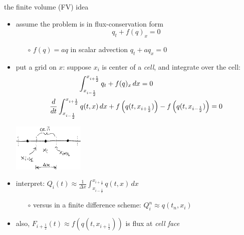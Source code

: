 \documentclass[10pt,hyperref,dvipsnames]{beamer}
\newcommand{\xiphalf}{{x_{i+\frac{1}{2}}}}
\newcommand{\ximhalf}{{x_{i-\frac{1}{2}}}}
\newcommand{\Fiphalf}{{F_{i+\frac{1}{2}}}}
\newcommand{\ds}{\displaystyle}
\begin{document}
\begin{frame}{the finite volume (FV) idea}

\begin{itemize}
\item assume the problem is in flux-conservation form
    $$q_t + f(q)_x = 0$$

    \begin{itemize}
    \item[$\circ$] $f(q) = aq$ in scalar advection $q_t + a q_x = 0$
    \end{itemize}
\item put a grid on $x$: suppose $x_i$ is center of a \emph{cell}, and integrate over the cell:
\begin{gather*}
\int_\ximhalf^\xiphalf q_t + f(q)_x \,dx = 0 \hspace{20mm}  \\
\frac{d}{dt} \int_\ximhalf^\xiphalf q(t,x) \,dx + f\left(q(t,\xiphalf)\right) - f\left(q(t,\ximhalf)\right) = 0
\end{gather*}

\vspace{-4mm}
\hfill \includegraphics[width=0.27\textwidth]{figs/fvsketch}

\vspace{-20mm}
\item interpret: $\ds Q_i(t) \approx \frac{1}{\Delta x} \int_\ximhalf^\xiphalf q(t,x)\,dx$
    \begin{itemize}
    \item[$\circ$] versus in a finite difference scheme: $Q_i^n \approx q(t_n,x_i)$
    \end{itemize}
\item also, $\Fiphalf(t) \approx f\left(q(t,\xiphalf)\right)$ is flux at \emph{cell face}
\end{itemize}
\end{frame}
\end{document}
